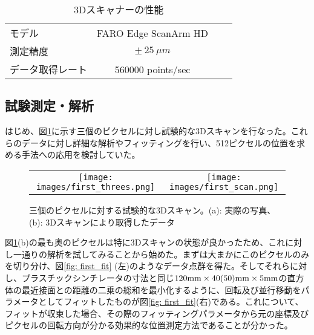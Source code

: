 \documentclass[Yonemoto_master.tex]{subfiles}
\begin{document}
\begin{table}[h]
 \centering
 \caption{3Dスキャナーの性能 \cite{FARO}}
 \label{tab: FARO_spec}
  \begin{tabular}{lccc}
   \hline
   モデル & FARO Edge ScanArm HD \\
   測定精度 & $\pm \ 25 \ \mu m$ \\
   データ取得レート & 560000 points/sec \\
   \hline
  \end{tabular}
\end{table}


\subsection{試験測定・解析}

はじめ、図\ref{fig: first_scan}に示す三個のピクセルに対し試験的な3Dスキャンを行なった。これらのデータに対し詳細な解析やフィッティングを行い、512ピクセルの位置を求める手法への応用を検討していた。

\begin{figure}[h]
    \begin{tabular}{cc}
      \begin{minipage}[t]{0.45\hsize}
        \centering
        \texttt{[image: images/first\_threes.png]}
        \caption*{(a)}
      \end{minipage} &
      \begin{minipage}[t]{0.45\hsize}
        \centering
        \texttt{[image: images/first\_scan.png]}
        \caption*{(b)}
      \end{minipage}
    \end{tabular}
    \caption{三個のピクセルに対する試験的な3Dスキャン。(a): 実際の写真、(b): 3Dスキャンにより取得したデータ}
    \label{fig: first_scan}
  \end{figure}
 
図\ref{fig: first_scan}(b)の最も奥のピクセルは特に3Dスキャンの状態が良かったため、これに対し一通りの解析を試してみることから始めた。まずは大まかにこのピクセルのみを切り分け、図\ref{fig: first_fit} (左)のようなデータ点群を得た。そしてそれらに対し、プラスチックシンチレータの寸法と同じ$120 {\rm mm} \times 40 (50){\rm mm} \times 5 {\rm mm}$の直方体の最近接面との距離の二乗の総和を最小化するように、回転及び並行移動をパラメータとしてフィットしたものが図\ref{fig: first_fit}(右)である。これについて、フィットが収束した場合、その際のフィッティングパラメータから元の座標及びピクセルの回転方向が分かる効果的な位置測定方法であることが分かった。
 
\end{document}
